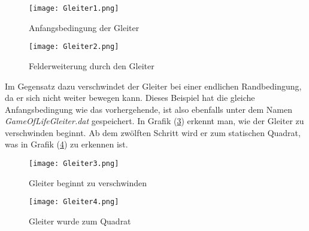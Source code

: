 \documentclass{scrartcl}
\begin{document}
\begin{figure}[p]
	\begin{center}
		\texttt{[image: Gleiter1.png]}
		\caption{Anfangsbedingung der Gleiter}
		\label{gleit1}
	\end{center}
\end{figure}
\begin{figure}[p]
	\begin{center}
		\texttt{[image: Gleiter2.png]}
		\caption{Felderweiterung durch den Gleiter}
		\label{gleit2}
	\end{center}
\end{figure}

Im Gegensatz dazu verschwindet der Gleiter bei einer endlichen Randbedingung, da er sich nicht weiter bewegen kann. Dieses Beispiel hat die gleiche Anfangsbedingung wie das vorhergehende, ist also ebenfalls unter dem Namen \textit{GameOfLifeGleiter.dat} gespeichert. In Grafik (\ref{gleit3}) erkennt man, wie der Gleiter zu verschwinden beginnt. Ab dem zwölften Schritt wird er zum statischen Quadrat, was in Grafik (\ref{gleit4}) zu erkennen ist.

\begin{figure}[p]
	\begin{center}
		\texttt{[image: Gleiter3.png]}
		\caption{Gleiter beginnt zu verschwinden}
		\label{gleit3}
	\end{center}
\end{figure}
\begin{figure}[p]
	\begin{center}
		\texttt{[image: Gleiter4.png]}
		\caption{Gleiter wurde zum Quadrat}
		\label{gleit4}
	\end{center}
\end{figure}
\end{document}
